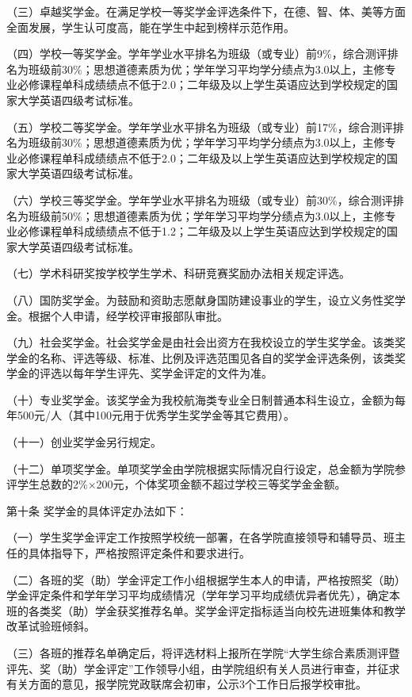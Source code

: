 \documentclass[UTF8,12pt,a4paper]{report}
\begin{document}
（三）卓越奖学金。在满足学校一等奖学金评选条件下，在德、智、体、美等方面全面发展，学生认可度高，能在学生中起到榜样示范作用。

（四）学校一等奖学金。学年学业水平排名为班级（或专业）前9\%，综合测评排名为班级前30\%；思想道德素质为优；学年学习平均学分绩点为3.0以上，主修专业必修课程单科成绩绩点不低于2.0；二年级及以上学生英语应达到学校规定的国家大学英语四级考试标准。

（五）学校二等奖学金。学年学业水平排名为班级（或专业）前17\%，综合测评排名为班级前30\%；思想道德素质为优；学年学习平均学分绩点为3.0以上，主修专业必修课程单科成绩绩点不低于2.0；二年级及以上学生英语应达到学校规定的国家大学英语四级考试标准。

（六）学校三等奖学金。学年学业水平排名为班级（或专业）前30\%，综合测评排名为班级前50\%；思想道德素质为优；学年学习平均学分绩点为3.0以上，主修专业必修课程单科成绩绩点不低于1.2；二年级及以上学生英语应达到学校规定的国家大学英语四级考试标准。

（七）学术科研奖按学校学生学术、科研竞赛奖励办法相关规定评选。

（八）国防奖学金。为鼓励和资助志愿献身国防建设事业的学生，设立义务性奖学金。根据个人申请，经学校评审报部队审批。

（九）社会奖学金。社会奖学金是由社会出资方在我校设立的学生奖学金。该类奖学金的名称、评选等级、标准、比例及评选范围见各自的奖学金评选条例，该类奖学金的评选以每年学生评先、奖学金评定的文件为准。

（十）专业奖学金。该奖学金为我校航海类专业全日制普通本科生设立，金额为每年500元/人（其中100元用于优秀学生奖学金等其它费用）。

（十一）创业奖学金另行规定。

（十二）单项奖学金。单项奖学金由学院根据实际情况自行设定，总金额为学院参评学生总数的2\%$\times$200元，个体奖项金额不超过学校三等奖学金金额。

第十条  奖学金的具体评定办法如下：

（一）学生奖学金评定工作按照学校统一部署，在各学院直接领导和辅导员、班主任的具体指导下，严格按照评定条件和要求进行。

（二）各班的奖（助）学金评定工作小组根据学生本人的申请，严格按照奖（助）学金评定条件和学年学习平均成绩情况（学年学习平均成绩优异者优先），确定本班的各类奖（助）学金获奖推荐名单。奖学金评定指标适当向校先进班集体和教学改革试验班倾斜。

（三）各班的推荐名单确定后，将评选材料上报所在学院“大学生综合素质测评暨评先、奖（助）学金评定”工作领导小组，由学院组织有关人员进行审查，并征求有关方面的意见，报学院党政联席会初审，公示3个工作日后报学校审批。
\end{document}
